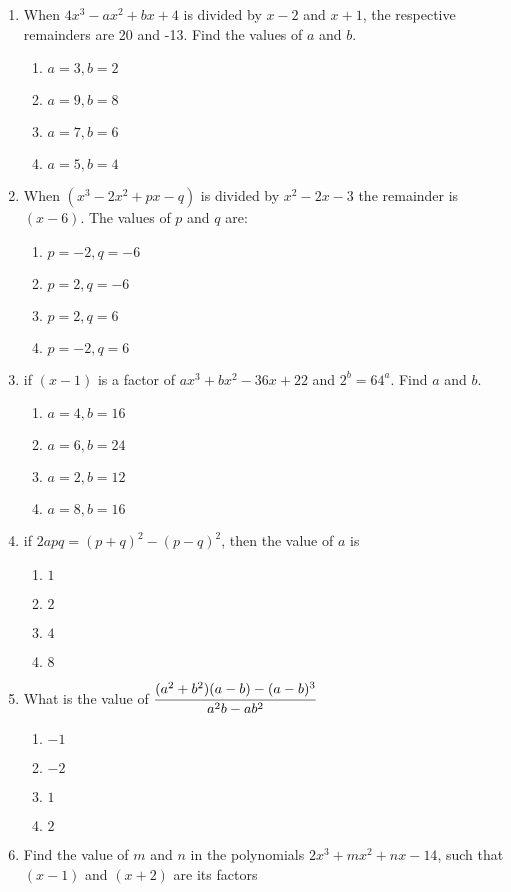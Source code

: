 \begin{multicols}{2}
\begin{enumerate}[label={\arabic*.}]
\item When $4x^3 - ax^2 + bx + 4$ is divided by $x-2$ and $x+1$, the respective remainders are 20 and -13. Find the values of $a$ and $b$.
	\begin{enumerate}[label={\Alph*.}]
	\item \(a= 3, b =2\)
	\item \(a=9, b=8\)
	\item \(a=7, b =6\)
	\item \(a=5,b=4\)
	\end{enumerate}
\item When $(x^3 - 2x^2 + px -q)$ is divided by $x^2 - 2x -3$ the remainder is $(x-6)$. The values of $p$ and $q$ are: 
	\begin{enumerate}[label={\Alph*.}]
	\item \(p = -2, q = -6\)
	\item \(p = 2, q = -6\)
	\item \(p = 2, q = 6\)
	\item \(p = -2, q = 6\)
	\end{enumerate}
\item if $(x-1)$ is a factor of $ax^3 + bx^2 -36x + 22$ and $2^b = 64^a$. Find $a$ and $b$.
	\begin{enumerate}[label={\Alph*.}]
	\item \(a= 4, b =16\)
	\item \(a = 6, b =24\)
	\item \(a = 2, b =12\)
	\item \(a = 8, b = 16\)
	\end{enumerate}
\item if $2apq = (p+q)^2 - (p-q)^2$, then the value of $a$ is 
	\begin{enumerate}[label={\Alph*.}]
	\item \(1\)
	\item \(2\)
	\item \(4\)
	\item \(8\)
	\end{enumerate}
\item What is the value of $\cfrac{(a^2 + b^2)(a-b) - (a-b)^3}{a^2b - ab^2}$
	\begin{enumerate}[label={\Alph*.}]
	\item \(-1\)
	\item \(-2\)
	\item \(1\)
	\item \(2\)
	\end{enumerate}
\item Find the value of $m$ and $n$ in the polynomials $2x^3 + mx^2 + nx -14$, such that $(x-1)$ and $(x+2)$ are its factors

\end{enumerate}
\end{multicols}
